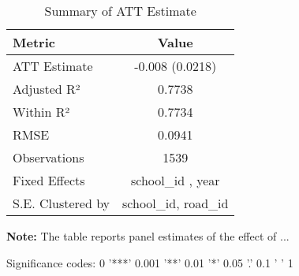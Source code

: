 \begin{table}[H]
\centering
\caption{Summary of ATT Estimate}
\label{tab:SA_cl_10p}
 \begin{center}
 \begin{tabular}{lc}
 \toprule
Metric & Value \\
\midrule
ATT Estimate & -0.008 (0.0218) \\
\hline 
 Adjusted R² & 0.7738 \\
Within R² & 0.7734 \\
RMSE & 0.0941 \\
Observations & 1539 \\
\hline 
 Fixed Effects & school_id ,  year \\
S.E. Clustered by & school_id, road_id \\
\bottomrule
\end{tabular}
 \end{center}\begin{tablenotes}
\small
\item \textbf{Note:} The table reports panel estimates of the effect of ...
\item Significance codes: 0 '***' 0.001 '**' 0.01 '*' 0.05 '.' 0.1 ' ' 1
\end{tablenotes}
\end{table}
